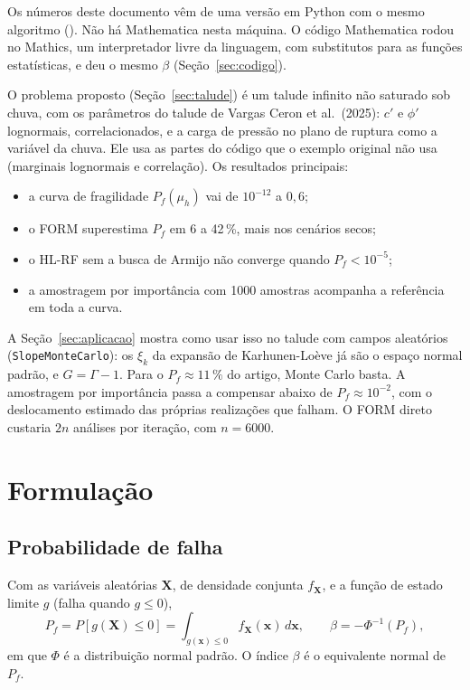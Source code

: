 \documentclass[11pt,a4paper]{article}
\begin{document}
Os números deste documento vêm de uma versão em Python com o mesmo algoritmo (). Não há Mathematica
nesta máquina. O código Mathematica rodou no Mathics, um interpretador livre da linguagem, com substitutos para as
funções estatísticas, e deu o mesmo $\beta$ (Seção~\ref{sec:codigo}).

O problema proposto (Seção~\ref{sec:talude}) é um talude infinito não saturado sob chuva, com os parâmetros do talude
de Vargas Ceron et al.\ (2025): $c'$ e $\phi'$ lognormais, correlacionados, e a carga de pressão no plano de ruptura
como a variável da chuva. Ele usa as partes do código que o exemplo original não usa (marginais lognormais e
correlação). Os resultados principais:
\begin{itemize}
  \item a curva de fragilidade $P_f(\mu_h)$ vai de $10^{-12}$ a $0{,}6$;
  \item o FORM superestima $P_f$ em 6 a 42\,\%, mais nos cenários secos;
  \item o HL-RF sem a busca de Armijo não converge quando $P_f < 10^{-5}$;
  \item a amostragem por importância com 1000 amostras acompanha a referência em toda a curva.
\end{itemize}

A Seção~\ref{sec:aplicacao} mostra como usar isso no talude com campos aleatórios (\texttt{SlopeMonteCarlo}): os
$\xi_k$ da expansão de Karhunen-Loève já são o espaço normal padrão, e $G = \Gamma - 1$. Para o $P_f \approx 11\,\%$
do artigo, Monte Carlo basta. A amostragem por importância passa a compensar abaixo de $P_f \approx 10^{-2}$, com o
deslocamento estimado das próprias realizações que falham. O FORM direto custaria $2n$ análises por iteração, com
$n = 6000$.

\section{Formulação}
\label{sec:formulacao}

\subsection{Probabilidade de falha}
Com as variáveis aleatórias $\bm X$, de densidade conjunta $f_{\bm X}$, e a função de estado limite $g$ (falha quando
$g \leq 0$),
\begin{equation}
  P_f = P[g(\bm X) \leq 0] = \int_{g(\bm x) \leq 0} f_{\bm X}(\bm x)\, d\bm x,
  \qquad \beta = -\Phi^{-1}(P_f),
\end{equation}
em que $\Phi$ é a distribuição normal padrão. O índice $\beta$ é o equivalente normal de $P_f$.
\end{document}
